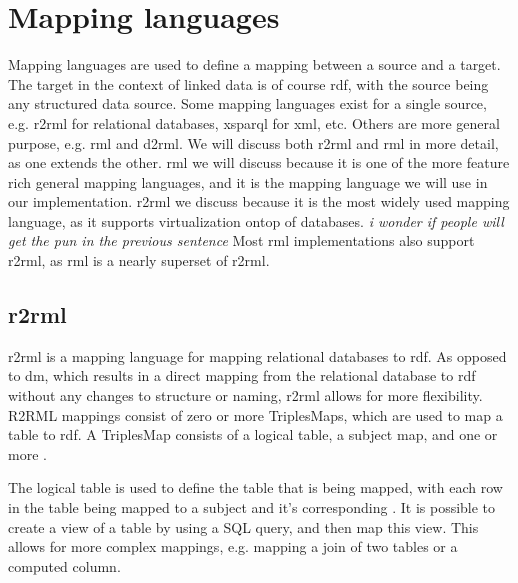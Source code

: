 \section{Mapping languages}
Mapping languages are used to define a mapping between a source and a target. The target in the context of linked data is of course \acrshort{rdf}, with the source being any structured data source. Some mapping languages exist for a single source, e.g. \acrfull{r2rml} for relational databases, \acrfull{xsparql} for \acrshort{xml}, etc. Others are more general purpose, e.g. \acrfull{rml} and \acrfull{d2rml}. 
We will discuss both \acrshort{r2rml} and \acrshort{rml} in more detail, as one extends the other. \acrshort{rml} we will discuss because it is one of the more feature rich general mapping languages, and it is the mapping language we will use in our implementation. \acrshort{r2rml} we discuss because it is the most widely used mapping language, as it supports virtualization ontop of databases. \textit{i wonder if people will get the pun in the previous sentence} Most \acrshort{rml} implementations also support \acrshort{r2rml}, as \acrshort{rml} is a nearly superset of \acrshort{r2rml}. 

\subsection{\acrshort{r2rml}}
\acrfull{r2rml} is a mapping language for mapping relational databases to \acrshort{rdf}. As opposed to \acrfull{dm}, which results in a direct mapping from the relational database to \acrshort{rdf} without any changes to structure or naming, \acrshort{r2rml} allows for more flexibility. R2RML mappings consist of zero or more TriplesMaps, which are used to map a table to \acrshort{rdf}. A TriplesMap consists of a logical table, a subject map, and one or more . 

The logical table is used to define the table that is being mapped, with each row in the table being mapped to a subject and it's corresponding . It is possible to create a view of a table by using a SQL query, and then map this view. This allows for more complex mappings, e.g. mapping a join of two tables or a computed column. 


